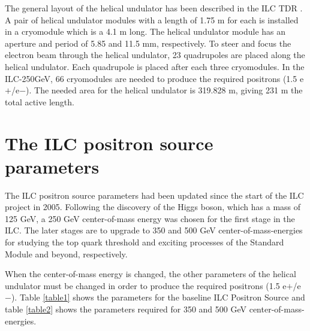 \documentclass[a4paper]{article}
\begin{document}
The general layout of the helical undulator has been described in the ILC TDR \cite {adolphsen2013international}. A pair of helical undulator modules with a length of 1.75 m for each is installed in a cryomodule which is a 4.1 m long. The helical undulator module has an aperture and period of 5.85 and 11.5 mm, respectively. To steer and focus the electron beam through the helical undulator, 23 quadrupoles are placed along the helical undulator. Each quadrupole is placed after each three cryomodules. In the ILC-250GeV, 66 cryomodules are needed to produce the required positrons (1.5 e$+$/e$-$). The needed area for the helical undulator is 319.828 m, giving 231 m the total active length. 










\section{The ILC positron source parameters}

The ILC positron source parameters had been updated since the start of the ILC project in 2005. Following the discovery of the Higgs boson, which has a mass of 125 GeV, a 250 GeV center-of-mass energy was chosen for the first stage in the ILC. The later stages are to upgrade to 350 and 500 GeV center-of-mass-energies for studying the top quark threshold and exciting processes of the Standard Module and beyond, respectively.

When the center-of-mass energy is changed, the other parameters of the helical undulator must be changed in order to produce the required positrons (1.5 e$+$/e$-$). Table \ref{table1} shows the parameters for the baseline ILC Positron Source and table \ref{table2} shows the parameters required for 350 and 500 GeV center-of-mass-energies.
\end{document}
